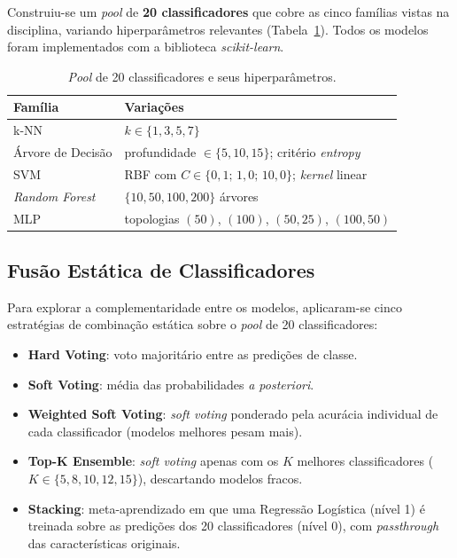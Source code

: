 \documentclass[12pt]{article}
\begin{document}
Construiu-se um \textit{pool} de \textbf{20 classificadores} que cobre as cinco
famílias vistas na disciplina, variando hiperparâmetros relevantes
(Tabela~\ref{tab:clf}). Todos os modelos foram implementados com a biblioteca
\textit{scikit-learn}.

\begin{table}[H]
\centering
\caption{\textit{Pool} de 20 classificadores e seus hiperparâmetros.}
\label{tab:clf}
\begin{tabular}{lp{8.5cm}}
\toprule
Família & Variações \\
\midrule
k-NN & $k \in \{1,3,5,7\}$ \\
Árvore de Decisão & profundidade $\in \{5,10,15\}$; critério \textit{entropy} \\
SVM & RBF com $C \in \{0{,}1;\,1{,}0;\,10{,}0\}$; \textit{kernel} linear \\
\textit{Random Forest} & $\{10,50,100,200\}$ árvores \\
MLP & topologias $(50)$, $(100)$, $(50,25)$, $(100,50)$ \\
\bottomrule
\end{tabular}
\end{table}

\subsection{Fusão Estática de Classificadores}

Para explorar a complementaridade entre os modelos, aplicaram-se cinco
estratégias de combinação estática sobre o \textit{pool} de 20 classificadores:

\begin{itemize}
  \item \textbf{Hard Voting}: voto majoritário entre as predições de classe.
  \item \textbf{Soft Voting}: média das probabilidades \textit{a posteriori}.
  \item \textbf{Weighted Soft Voting}: \textit{soft voting} ponderado pela
        acurácia individual de cada classificador (modelos melhores pesam mais).
  \item \textbf{Top-K Ensemble}: \textit{soft voting} apenas com os $K$ melhores
        classificadores ($K \in \{5,8,10,12,15\}$), descartando modelos fracos.
  \item \textbf{Stacking}: meta-aprendizado em que uma Regressão Logística
        (nível 1) é treinada sobre as predições dos 20 classificadores (nível 0),
        com \textit{passthrough} das características originais.
\end{itemize}
\end{document}
